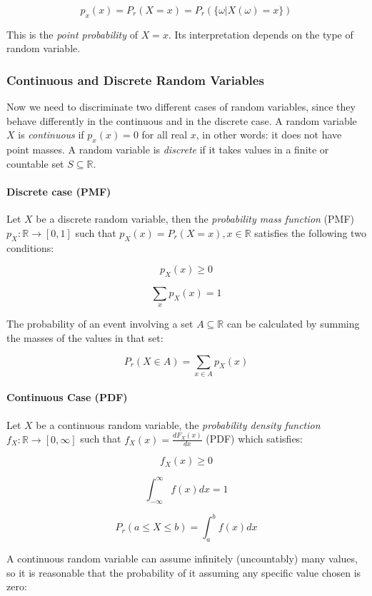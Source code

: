\documentclass{article}
\begin{document}
\[p_x(x) = P_r(X = x) = P_r(\{\omega | X(\omega ) = x\})\]

This is the \emph{point probability} of \(X = x\). Its interpretation
depends on the type of random variable.

\subsubsection{Continuous and Discrete Random
Variables}\label{continuous-and-discrete-random-variables}

Now we need to discriminate two different cases of random variables,
since they behave differently in the continuous and in the discrete
case. A random variable \(X\) is \emph{continuous} if \(p_x(x) = 0\) for
all real \(x\), in other words: it does not have point masses. A random
variable is \emph{discrete} if it takes values in a finite or countable
set \(S \subseteq \mathbb{R}\).

\paragraph{Discrete case (PMF)}\label{discrete-case-pmf}

Let \(X\) be a discrete random variable, then the \emph{probability mass
function} (PMF) \(p_X: \mathbb{R} \rightarrow [0, 1]\) such that
\(p_X(x) = P_r(X=x), x\in
\mathbb{R}\) satisfies the following two conditions:

\[p_X(x) \ge 0\]

\[\sum_x p_X(x) = 1\]

The probability of an event involving a set \(A \subseteq \mathbb{R}\)
can be calculated by summing the masses of the values in that set:

\[P_r(X\in A) = \sum_{x\in A} p_X(x)\]

\paragraph{Continuous Case (PDF)}\label{continuous-case-pdf}

Let \(X\) be a continuous random variable, the \emph{probability density
function} \(f_X: \mathbb{R} \rightarrow [0, \infty]\) such that
\(f_X(x) =
\frac{dF_X(x)}{dx}\) (PDF) which satisfies:

\[f_X(x) \ge 0\]

\[\int_{-\infty}^{\infty} f(x) dx = 1\]

\[P_r(a\le X \le b) = \int_a^b f(x) dx\]

A continuous random variable can assume infinitely (uncountably) many
values, so it is reasonable that the probability of it assuming any
specific value chosen is zero:
\end{document}
